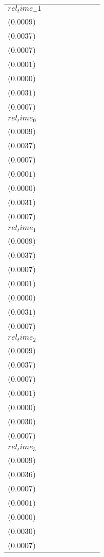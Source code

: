 \begin{tabular}{llllllll}
$rel_time_-1$ & \makecell{$0.0013^{}$ \\ ($0.0009$)} & \makecell{$0.0055^{}$ \\ ($0.0037$)} & \makecell{$0.0029^{***}$ \\ ($0.0007$)} & \makecell{$0.0003^{***}$ \\ ($0.0001$)} & \makecell{$0.0001^{***}$ \\ ($0.0000$)} & \makecell{$0.0056^{*}$ \\ ($0.0031$)} & \makecell{$0.0012^{}$ \\ ($0.0007$)} \\
$rel_time_0$ & \makecell{$0.0015^{*}$ \\ ($0.0009$)} & \makecell{$0.0062^{*}$ \\ ($0.0037$)} & \makecell{$0.0025^{***}$ \\ ($0.0007$)} & \makecell{$0.0002^{***}$ \\ ($0.0001$)} & \makecell{$0.0001^{***}$ \\ ($0.0000$)} & \makecell{$0.0054^{*}$ \\ ($0.0031$)} & \makecell{$0.0012^{}$ \\ ($0.0007$)} \\
$rel_time_1$ & \makecell{$0.0026^{***}$ \\ ($0.0009$)} & \makecell{$0.0097^{***}$ \\ ($0.0037$)} & \makecell{$0.0027^{***}$ \\ ($0.0007$)} & \makecell{$0.0002^{**}$ \\ ($0.0001$)} & \makecell{$0.0001^{***}$ \\ ($0.0000$)} & \makecell{$0.0079^{**}$ \\ ($0.0031$)} & \makecell{$0.0021^{***}$ \\ ($0.0007$)} \\
$rel_time_2$ & \makecell{$0.0031^{***}$ \\ ($0.0009$)} & \makecell{$0.0124^{***}$ \\ ($0.0037$)} & \makecell{$0.0018^{***}$ \\ ($0.0007$)} & \makecell{$0.0002^{**}$ \\ ($0.0001$)} & \makecell{$0.0001^{**}$ \\ ($0.0000$)} & \makecell{$0.0114^{***}$ \\ ($0.0030$)} & \makecell{$0.0029^{***}$ \\ ($0.0007$)} \\
$rel_time_3$ & \makecell{$0.0037^{***}$ \\ ($0.0009$)} & \makecell{$0.0149^{***}$ \\ ($0.0036$)} & \makecell{$0.0002^{}$ \\ ($0.0007$)} & \makecell{$0.0001^{}$ \\ ($0.0001$)} & \makecell{$-0.0000^{}$ \\ ($0.0000$)} & \makecell{$0.0131^{***}$ \\ ($0.0030$)} & \makecell{$0.0031^{***}$ \\ ($0.0007$)} \\

\end{tabular}

